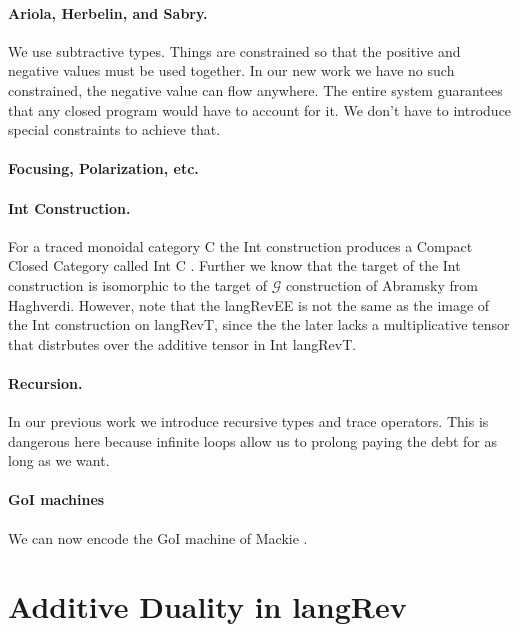 \documentclass[preprint]{sigplanconf}
\newcommand{\G}{\ensuremath{\mathcal{G}}\xspace}
\begin{document}
\paragraph*{Ariola, Herbelin, and Sabry.} We use subtractive types. Things
are constrained so that the positive and negative values must be used
together. In our new work we have no such constrained, the negative value can
flow anywhere. The entire system guarantees that any closed program would
have to account for it. We don't have to introduce special constraints to
achieve that.

\paragraph*{Focusing, Polarization, etc.}

\paragraph*{Int Construction.}
For a traced monoidal category {{C}} the Int construction produces a
Compact Closed Category called Int {{C}} \cite{joyal1996traced}.
Further we know that the target of the Int construction is isomorphic
to the target of \G construction of Abramsky \cite{Abramsky96:0} from
Haghverdi. However, note that the {{langRevEE}} is not the same as the
image of the Int construction on {{langRevT}}, since the the later
lacks a multiplicative tensor that distrbutes over the additive tensor
in Int {{langRevT}}.

\paragraph*{Recursion.} In our previous work we introduce recursive types and
trace operators. This is dangerous here because infinite loops allow us to
prolong paying the debt for as long as we want.


\paragraph*{GoI machines} 
We can now encode the GoI machine of Mackie \cite{Mackie2011,DBLP:conf/popl/Mackie95}.


\section{Additive Duality in {{langRev}} }
\end{document}

